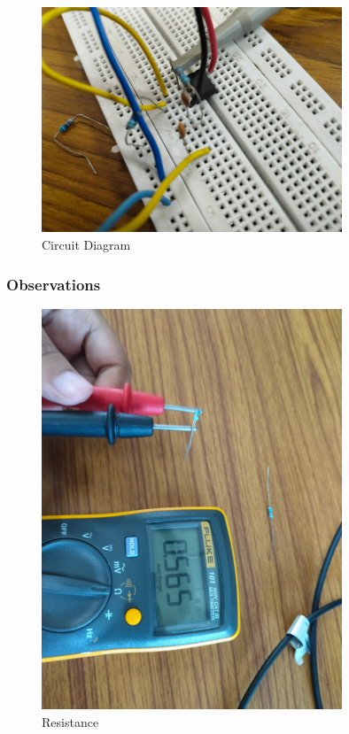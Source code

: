 \documentclass[a4paper,12pt]{article}
\begin{document}
\begin{figure}[H]
    \centering
    \includegraphics[width=0.8\textwidth]{fig/hp.jpeg}
    \caption{Circuit Diagram}
    \label{fig:your-label}
\end{figure}

\subsubsection{Observations}

\begin{figure}[H]
    \centering
    \includegraphics[width=0.8\textwidth]{fig/m/560kohm.jpeg}
    \caption{Resistance}
    \label{fig:your-label}
\end{figure}
\end{document}
